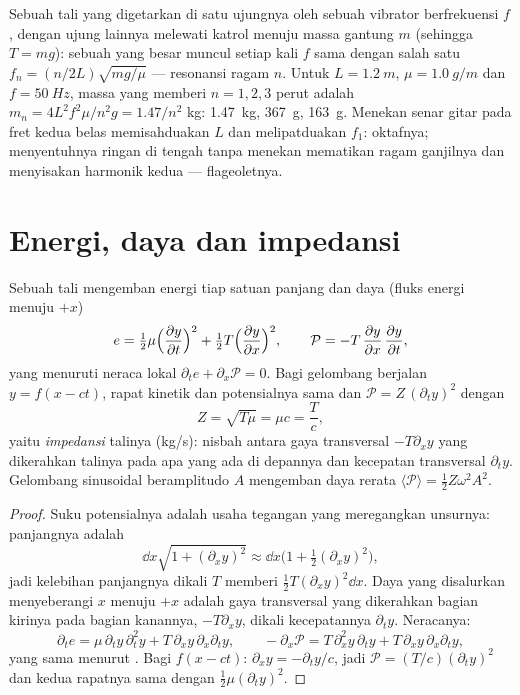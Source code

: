 \begin{example}\label{ex:b2:waves-on-strings:melde}
Sebuah tali yang digetarkan di satu ujungnya oleh sebuah vibrator berfrekuensi $f$, dengan ujung lainnya
melewati katrol menuju massa gantung $m$ (sehingga $T = mg$): sebuah
 yang besar muncul setiap kali $f$ sama dengan salah satu $f_n = (n/2L)
\sqrt{mg/\mu}$ --- resonansi ragam $n$. Untuk $L = \qty{1.2}{m}$, $\mu =
\qty{1.0}{g/m}$ dan $f = \qty{50}{Hz}$, massa yang memberi $n = 1, 2, 3$ perut
adalah $m_n = 4L^2f^2\mu/n^2g = 1.47/n^2$ kg: \qty{1.47}{kg}, \qty{367}{g}, \qty{163}{g}.
Menekan senar gitar pada fret kedua belas memisahduakan $L$ dan melipatduakan
$f_1$: oktafnya; menyentuhnya ringan di tengah tanpa menekan
mematikan ragam ganjilnya dan menyisakan harmonik kedua --- flageoletnya.
\end{example}

\section{Energi, daya dan impedansi}

\begin{proposition}\label{prop:b2:waves-on-strings:energy}
Sebuah tali mengemban energi tiap satuan panjang dan daya (fluks
energi menuju $+x$)
\[
e = \tfrac12\mu\Bigl(\frac{\partial y}{\partial t}\Bigr)^2 + \tfrac12T\Bigl(\frac{\partial y}{\partial x}\Bigr)^2 ,
\qquad
\mathcal P = -T\,\frac{\partial y}{\partial x}\,\frac{\partial y}{\partial t} ,
\]
yang menuruti neraca lokal $\partial_te + \partial_x\mathcal P = 0$. Bagi
gelombang berjalan $y = f(x - ct)$, rapat kinetik dan potensialnya
sama dan $\mathcal P = Z\,(\partial_ty)^2$ dengan
\[
Z = \sqrt{T\mu} = \mu c = \frac Tc ,
\]
yaitu \emph{impedansi} talinya (\unit{kg/s}): nisbah antara
gaya transversal $-T\partial_xy$ yang dikerahkan talinya pada apa yang ada di depannya
dan kecepatan transversal $\partial_ty$. Gelombang sinusoidal beramplitudo $A$
mengemban daya rerata $\langle\mathcal P\rangle = \tfrac12Z\omega^2A^2$.
\end{proposition}

\begin{proof}
Suku potensialnya adalah usaha tegangan yang meregangkan unsurnya:
panjangnya adalah
\[
\dd x\sqrt{1 + (\partial_xy)^2} \approx \dd x\bigl(1 + \tfrac12(\partial_xy)^2\bigr) ,
\]
jadi kelebihan panjangnya dikali $T$ memberi $\tfrac12T(\partial_xy)^2\dd x$. Daya
yang disalurkan menyeberangi $x$ menuju $+x$ adalah gaya transversal yang dikerahkan
bagian kirinya pada bagian kanannya, $-T\partial_xy$, dikali kecepatannya
$\partial_ty$. Neracanya:
\[
\partial_te = \mu\,\partial_ty\,\partial_t^2y + T\,\partial_xy\,\partial_x\partial_ty ,
\qquad
-\partial_x\mathcal P = T\,\partial_x^2y\,\partial_ty + T\,\partial_xy\,\partial_x\partial_ty ,
\]
yang sama menurut . Bagi $f(x - ct)$: $\partial_xy = -\partial_ty/c$, jadi $\mathcal P = (T/c)
(\partial_ty)^2$ dan kedua rapatnya sama dengan $\tfrac12\mu(\partial_ty)^2$.
\end{proof}

